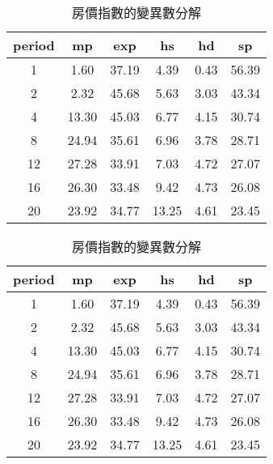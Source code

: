 \begin{table}[h]
\centering
\begin{tabular}{cccccc}
  \hline
period & mp & exp & hs & hd & sp \\ 
  \hline
1 & 1.60 & 37.19 & 4.39 & 0.43 & 56.39 \\ 
   \hline
2 & 2.32 & 45.68 & 5.63 & 3.03 & 43.34 \\ 
   \hline
4 & 13.30 & 45.03 & 6.77 & 4.15 & 30.74 \\ 
   \hline
8 & 24.94 & 35.61 & 6.96 & 3.78 & 28.71 \\ 
   \hline
12 & 27.28 & 33.91 & 7.03 & 4.72 & 27.07 \\ 
   \hline
16 & 26.30 & 33.48 & 9.42 & 4.73 & 26.08 \\ 
   \hline
20 & 23.92 & 34.77 & 13.25 & 4.61 & 23.45 \\ 
   \hline
\end{tabular}
\caption{房價指數的變異數分解} 
\end{table}
\begin{table}[h]
\centering
\begin{tabular}{cccccc}
  \hline
period & mp & exp & hs & hd & sp \\ 
  \hline
1 & 1.60 & 37.19 & 4.39 & 0.43 & 56.39 \\ 
   \hline
2 & 2.32 & 45.68 & 5.63 & 3.03 & 43.34 \\ 
   \hline
4 & 13.30 & 45.03 & 6.77 & 4.15 & 30.74 \\ 
   \hline
8 & 24.94 & 35.61 & 6.96 & 3.78 & 28.71 \\ 
   \hline
12 & 27.28 & 33.91 & 7.03 & 4.72 & 27.07 \\ 
   \hline
16 & 26.30 & 33.48 & 9.42 & 4.73 & 26.08 \\ 
   \hline
20 & 23.92 & 34.77 & 13.25 & 4.61 & 23.45 \\ 
   \hline
\end{tabular}
\caption{房價指數的變異數分解} 
\end{table}
